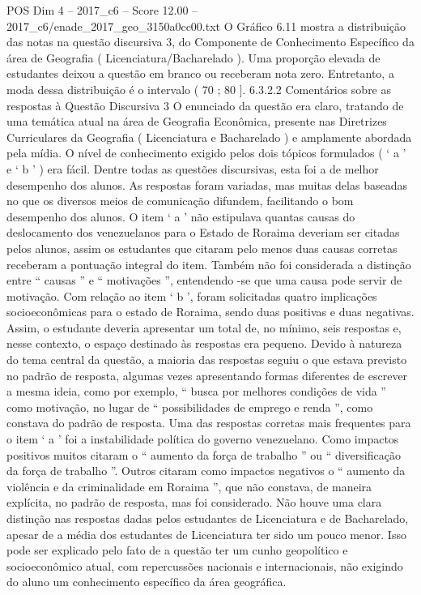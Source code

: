 \begin{textsample}{POS Dim 4 – 2017\_c6 – Score 12.00 – 2017\_c6/enade\_2017\_geo\_3150a0cc00.txt}
O Gráfico 6.11 mostra a distribuição das notas na questão discursiva 3, do Componente de Conhecimento Específico da área de Geografia ( Licenciatura/Bacharelado ).
Uma proporção elevada de estudantes deixou a questão em branco ou receberam nota zero.
Entretanto, a moda dessa distribuição é o intervalo ( 70 ; 80 ]. 6.3.2.2 Comentários sobre as respostas à Questão Discursiva 3 O enunciado da questão era claro, tratando de uma temática atual na área de Geografia Econômica, presente nas Diretrizes Curriculares da Geografia ( Licenciatura e Bacharelado ) e amplamente abordada pela mídia.
O nível de conhecimento exigido pelos dois tópicos formulados ( ‘ a ’ e ‘ b ’ ) era fácil.
Dentre todas as questões discursivas, esta foi a de melhor desempenho dos alunos.
As respostas foram variadas, mas muitas delas baseadas no que os diversos meios de comunicação difundem, facilitando o bom desempenho dos alunos.
O item ‘ a ’ não estipulava quantas causas do deslocamento dos venezuelanos para o Estado de Roraima deveriam ser citadas pelos alunos, assim os estudantes que citaram pelo menos duas causas corretas receberam a pontuação integral do item.
Também não foi considerada a distinção entre “ causas ” e “ motivações ”, entendendo -se que uma causa pode servir de motivação.
Com relação ao item ‘ b ’, foram solicitadas quatro implicações socioeconômicas para o estado de Roraima, sendo duas positivas e duas negativas.
Assim, o estudante deveria apresentar um total de, no mínimo, seis respostas e, nesse contexto, o espaço destinado às respostas era pequeno.
Devido à natureza do tema central da questão, a maioria das respostas seguiu o que estava previsto no padrão de resposta, algumas vezes apresentando formas diferentes de escrever a mesma ideia, como por exemplo, “ busca por melhores condições de vida ” como motivação, no lugar de “ possibilidades de emprego e renda ”, como constava do padrão de resposta.
Uma das respostas corretas mais frequentes para o item ‘ a ’ foi a instabilidade política do governo venezuelano.
Como impactos positivos muitos citaram o “ aumento da força de trabalho ” ou “ diversificação da força de trabalho ”.
Outros citaram como impactos negativos o “ aumento da violência e da criminalidade em Roraima ”, que não constava, de maneira explícita, no padrão de resposta, mas foi considerado.
Não houve uma clara distinção nas respostas dadas pelos estudantes de Licenciatura e de Bacharelado, apesar de a média dos estudantes de Licenciatura ter sido um pouco menor.
Isso pode ser explicado pelo fato de a questão ter um cunho geopolítico e socioeconômico atual, com repercussões nacionais e internacionais, não exigindo do aluno um conhecimento específico da área geográfica.

\end{textsample}
